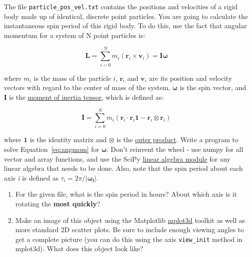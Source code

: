 \documentclass[10pt]{article}
\begin{document}
\vspace{5mm}




The file \texttt{particle\_pos\_vel.txt} contains the positions and velocities of
a rigid body made up of identical, discrete point particles.
You are going to calculate the instantaneous spin period of this rigid body.  To do
this, use the fact that angular momentum for a system of N point
particles is:

\begin{equation}
\mathbf{L} = \sum_{i=0}^{N} m_i (\mathbf{r}_i \times \mathbf{v}_i) =
\mathbf{I} \mathbf{\omega}
\label{eq:angmom}
\end{equation}

\noindent
where $m_i$ is the mass of the particle $i$, $\mathbf{r}_i$ and
$\mathbf{v}_i$ are its position and velocity vectors with regard to
the center of mass of the system, $\mathbf{\omega}$ is the spin vector,
and $\mathbf{I}$ is the \href{https://en.wikipedia.org/wiki/Moment_of_inertia#Inertia_tensor}{moment of inertia tensor}, which is defined as:

\begin{equation}
\mathbf{I} = \sum_{i=0}^{N} m_i ( \mathbf{r}_i \cdot  \mathbf{r}_i
\mathbf{1} - \mathbf{r}_i \otimes \mathbf{r}_i   ) 
\end{equation}

\noindent
where $\mathbf{1}$ is the identity matrix and $\otimes$ is the \href{https://en.wikipedia.org/wiki/Outer_product}{outer
product}.  Write a program to solve Equation~\ref{eq:angmom} for
$\mathbf{\omega}$.  Don't reinvent the wheel - use numpy for all
vector and array functions, and use the SciPy
\href{https://docs.scipy.org/doc/scipy/reference/linalg.html}{linear
  algebra module} for any linear algebra that needs to be done.  Also,
note that the spin period about each axis \textit{i} is defined as
$\tau_i = 2 \pi / |\mathbf{\omega_i}|$.

\begin{enumerate}

\item For the given file, what is the spin period in hours?  About
  which axis is it rotating the \textbf{most quickly}?

\item Make an image of this object using the Matplotlib
  \href{https://matplotlib.org/stable/tutorials/toolkits/mplot3d.html}{mplot3d}
  toolkit as well as more standard 2D scatter plots.  Be sure to include enough
  viewing angles to get a complete picture (you can do this using the
  axis \texttt{view\_init} method in mplot3d).  What does this object
  look like?

\end{enumerate}
\end{document}
